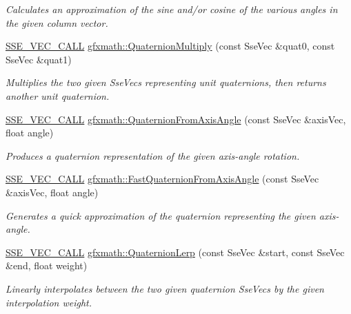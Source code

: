 \begin{DoxyCompactItemize}
\begin{DoxyCompactList}\small\item\em Calculates an approximation of the sine and/or cosine of the various angles in the given column vector. \end{DoxyCompactList}\item 
\hyperlink{ssevec__math__defs_8h_a97454f977a5281455cecacce1e8ba670}{S\+S\+E\+\_\+\+V\+E\+C\+\_\+\+C\+A\+L\+L} \hyperlink{group___s_i_m_d_vec_math_gaa6fdbae86d44a0c331da729efdc625e8}{gfxmath\+::\+Quaternion\+Multiply} (const Sse\+Vec \&quat0, const Sse\+Vec \&quat1)
\begin{DoxyCompactList}\small\item\em Multiplies the two given Sse\+Vecs representing unit quaternions, then returns another unit quaternion. \end{DoxyCompactList}\item 
\hyperlink{ssevec__math__defs_8h_a97454f977a5281455cecacce1e8ba670}{S\+S\+E\+\_\+\+V\+E\+C\+\_\+\+C\+A\+L\+L} \hyperlink{group___s_i_m_d_vec_math_ga1496fba93f6fadfbcc4b55c32c24df1a}{gfxmath\+::\+Quaternion\+From\+Axis\+Angle} (const Sse\+Vec \&axis\+Vec, float angle)
\begin{DoxyCompactList}\small\item\em Produces a quaternion representation of the given axis-\/angle rotation. \end{DoxyCompactList}\item 
\hyperlink{ssevec__math__defs_8h_a97454f977a5281455cecacce1e8ba670}{S\+S\+E\+\_\+\+V\+E\+C\+\_\+\+C\+A\+L\+L} \hyperlink{group___s_i_m_d_vec_math_ga7dc1807a176952cfbccf2065f5c7e455}{gfxmath\+::\+Fast\+Quaternion\+From\+Axis\+Angle} (const Sse\+Vec \&axis\+Vec, float angle)
\begin{DoxyCompactList}\small\item\em Generates a quick approximation of the quaternion representing the given axis-\/angle. \end{DoxyCompactList}\item 
\hyperlink{ssevec__math__defs_8h_a97454f977a5281455cecacce1e8ba670}{S\+S\+E\+\_\+\+V\+E\+C\+\_\+\+C\+A\+L\+L} \hyperlink{group___s_i_m_d_vec_math_ga019a858e63abf69d91b07797b1a90d6c}{gfxmath\+::\+Quaternion\+Lerp} (const Sse\+Vec \&start, const Sse\+Vec \&end, float weight)
\begin{DoxyCompactList}\small\item\em Linearly interpolates between the two given quaternion Sse\+Vecs by the given interpolation weight. \end{DoxyCompactList}\item 

\end{DoxyCompactItemize}
